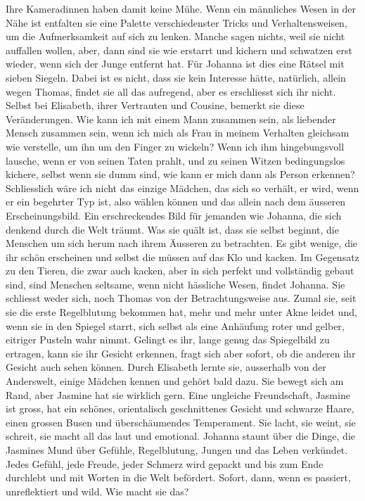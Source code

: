 Ihre Kameradinnen haben damit keine Mühe. Wenn ein männliches Wesen in der Nähe ist entfalten sie eine Palette verschiedenster Tricks und Verhaltensweisen, um die Aufmerksamkeit auf sich zu lenken. Manche sagen nichts, weil sie nicht auffallen wollen, aber, dann sind sie wie erstarrt und kichern und schwatzen erst wieder, wenn sich der Junge entfernt hat.
Für Johanna ist dies eine Rätsel mit sieben Siegeln. Dabei ist es nicht, dass sie kein Interesse hätte, natürlich, allein wegen Thomas, findet sie all das aufregend, aber es erschliesst sich ihr nicht. Selbst bei Elisabeth, ihrer Vertrauten und Cousine, bemerkt sie diese Veränderungen. Wie kann ich mit einem Mann zusammen sein, als liebender Mensch zusammen sein, wenn ich mich als Frau in meinem Verhalten gleichsam wie verstelle, um ihn um den Finger zu wickeln? Wenn ich ihm hingebungsvoll lausche, wenn er von seinen Taten prahlt, und zu seinen Witzen bedingungslos kichere, selbst wenn sie dumm sind, wie kann er  mich dann als Person erkennen? Schliesslich wäre ich nicht das einzige Mädchen, das sich so verhält, er wird, wenn er ein begehrter Typ ist, also wählen können und das allein nach dem äusseren Erscheinungsbild. 
Ein erschreckendes Bild für jemanden wie Johanna, die sich denkend durch die Welt träumt. Was sie quält ist, dass sie selbst beginnt, die Menschen um sich herum nach ihrem Äusseren zu betrachten. Es gibt wenige, die ihr schön erscheinen und selbst die müssen auf das Klo und kacken. Im Gegensatz zu den Tieren, die zwar auch kacken, aber in sich perfekt und vollständig gebaut sind, sind Menschen seltsame, wenn nicht hässliche Wesen, findet Johanna.  
Sie schliesst weder sich, noch Thomas von der Betrachtungsweise aus. Zumal sie, seit sie die erste Regelblutung bekommen hat,  mehr und mehr unter Akne leidet und, wenn sie in den Spiegel starrt, sich selbst als eine Anhäufung roter und gelber, eitriger Pusteln wahr nimmt. Gelingt es ihr, lange genug das Spiegelbild zu ertragen, kann sie ihr Gesicht erkennen, fragt sich aber sofort, ob die anderen ihr Gesicht auch sehen können.
Durch Elisabeth lernte sie, ausserhalb von der Anderswelt, einige Mädchen kennen und gehört bald dazu. Sie bewegt sich am Rand, aber Jasmine hat sie wirklich gern. Eine ungleiche Freundschaft, Jasmine ist gross, hat ein schönes, orientalisch geschnittenes Gesicht und schwarze Haare, einen grossen Busen und überschäumendes Temperament. Sie lacht, sie weint, sie schreit, sie macht all das laut und emotional. Johanna staunt über die Dinge, die Jasmines Mund über Gefühle, Regelblutung, Jungen und das Leben verkündet. Jedes Gefühl, jede Freude, jeder Schmerz wird gepackt und bis zum Ende durchlebt und mit Worten in die Welt befördert. Sofort, dann, wenn es passiert, unreflektiert und wild. Wie macht sie das?

